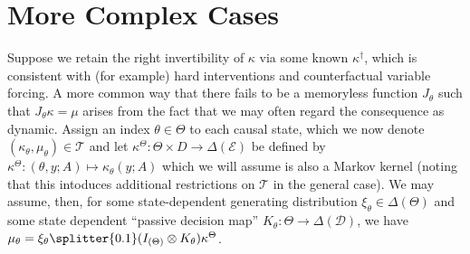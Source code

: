\section{More Complex Cases}

Suppose we retain the right invertibility of $\kappa$ via some known $\kappa^\dagger$, which is consistent with (for example) hard interventions and counterfactual variable forcing. A more common way that there fails to be a memoryless function $J_\theta$ such that $J_\theta\kappa=\mu$ arises from the fact that we may often regard the consequence as dynamic. Assign an index $\theta\in \Theta$ to each causal state, which we now denote $(\kappa_\theta,\mu_\theta)\in \mathscr{T}$ and let $\kappa^\Theta:\Theta\times D\to \Delta(\mathcal{E})$ be defined by $\kappa^\Theta:(\theta,y;A)\mapsto \kappa_\theta(y;A)$ which we will assume is also a Markov kernel (noting that this intoduces additional restrictions on $\mathscr{T}$ in the general case). We may assume, then, for some state-dependent generating distribution $\xi_\theta\in \Delta(\Theta)$ and some state dependent ``passive decision map'' $K_\theta:\Theta\to \Delta(\mathcal{D})$, we have $\mu_\theta = \xi_\theta\splitter{0.1}(I_{(\Theta)}\otimes K_\theta)\kappa^\Theta$. 


